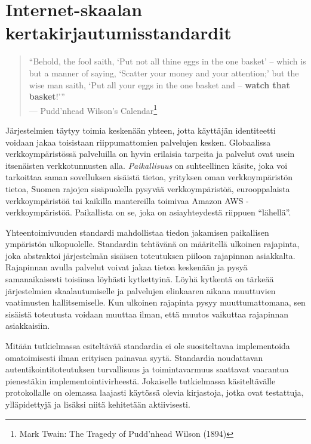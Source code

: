 \documentclass[finnish,gradu]{tktltiki}
\begin{document}



\newpage
\section{Internet-skaalan kertakirjautumisstandardit} %
\label{sec:Kertakirjautumisstandardit}
  \begin{quote}
      ``Behold, the fool saith, `Put not all thine eggs in the one basket'
      -- which is but a manner of saying, `Scatter your money and your attention;'
      but the wise man saith, `Put all your eggs in the one basket and -- \textbf{watch that basket}!'''
      \\--- Pudd'nhead Wilson's Calendar\footnote{
        Mark Twain: The Tragedy of Pudd'nhead Wilson (1894)
      }
  \end{quote}

  Järjestelmien täytyy toimia keskenään yhteen, jotta käyttäjän identiteetti voidaan jakaa toisistaan riippumattomien palvelujen kesken. Globaalissa verkkoympäristössä palveluilla on hyvin erilaisia tarpeita ja palvelut ovat usein itsenäisten verkkotunnusten alla. \emph{Paikallisuus} on suhteellinen käsite, joka voi tarkoittaa saman sovelluksen sisäistä tietoa, yrityksen oman verkkoympäristön tietoa, Suomen rajojen sisäpuolella pysyvää verkkoympäristöä, eurooppalaista verkkoympäristöä tai kaikilla mantereilla toimivaa Amazon AWS -verkkoympäristöä. Paikallista on se, joka on asiayhteydestä riippuen ``lähellä''.

  Yhteentoimivuuden standardi mahdollistaa tiedon jakamisen paikallisen ympäristön ulkopuolelle. Standardin tehtävänä on määritellä ulkoinen rajapinta, joka abstraktoi järjestelmän sisäisen toteutuksen piiloon rajapinnan asiakkalta. Rajapinnan avulla palvelut voivat jakaa tietoa keskenään ja pysyä samanaikaisesti toisiinsa löyhästi kytkettyinä. Löyhä kytkentä on tärkeää järjestelmien skaalautumiselle ja palvelujen elinkaaren aikana muuttuvien vaatimusten hallitsemiselle. Kun ulkoinen rajapinta pysyy muuttumattomana, sen sisäistä toteutusta voidaan muuttaa ilman, että muutos vaikuttaa rajapinnan asiakkaisiin.

  Mitään tutkielmassa esiteltävää standardia ei ole suositeltavaa implementoida omatoimisesti ilman erityisen painavaa syytä. Standardia noudattavan autentikointitoteutuksen turvallisuus ja toimintavarmuus saattavat vaarantua pienestäkin implementointivirheestä. Jokaiselle tutkielmassa käsiteltävälle protokollalle on olemassa laajasti käytössä olevia kirjastoja, jotka ovat testattuja, ylläpidettyjä ja lisäksi niitä kehitetään aktiivisesti.
\end{document}
